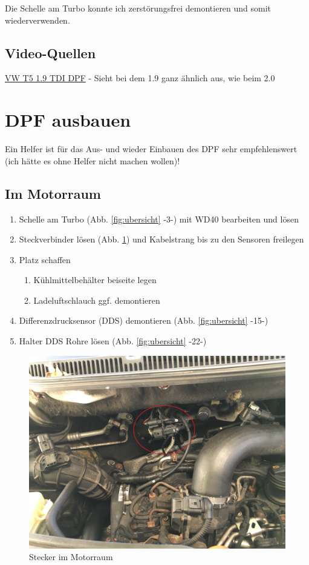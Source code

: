 \documentclass[twoside,a4paper]{refart}
\begin{document}
Die Schelle am Turbo konnte ich zerstörungsfrei demontieren und somit wiederverwenden.

\subsection{Video-Quellen}

\href{https://www.youtube.com/watch?v=Uml32Phw4O8}{VW T5 1.9 TDI DPF} - Sieht bei dem 1.9 ganz ähnlich aus, wie beim 2.0\\
\clearpage
\section{DPF ausbauen}
Ein Helfer ist für das Aus- und wieder Einbauen des DPF sehr empfehlenswert (ich hätte es ohne Helfer nicht machen wollen)! 

\subsection{Im Motorraum}
\begin{enumerate}
\item Schelle am Turbo (Abb. \ref{fig:ubersicht} -3-) mit WD40 bearbeiten und lösen
\item Steckverbinder lösen (Abb. \ref{fig:motorraum}) und Kabelstrang bis zu den Sensoren freilegen 
\item Platz schaffen
    \begin{enumerate}
    \item Kühlmittelbehälter beiseite legen
    \item Ladeluftschlauch ggf. demontieren
    \end{enumerate}
\item Differenzdrucksensor (DDS) demontieren (Abb. \ref{fig:ubersicht} -15-)
\item Halter DDS Rohre lösen (Abb. \ref{fig:ubersicht} -22-)
\end{enumerate}
\begin{figure}[htb]
	\begin{center}
		\includegraphics[width=\textwidth]{Motorraum.JPG}
		\caption{Stecker im Motorraum}
		\label{fig:motorraum}
	\end{center}
\end{figure}
\clearpage
\end{document}
